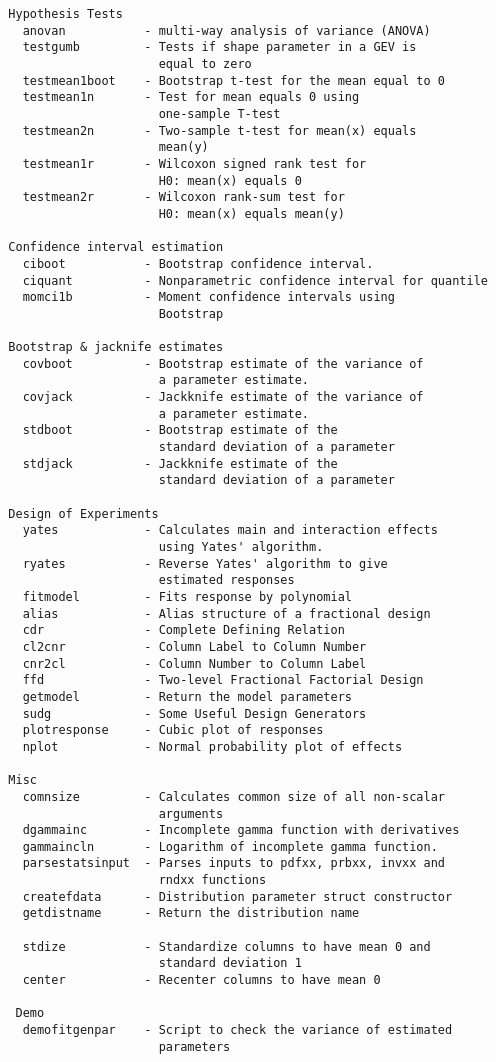 {\begin{verbatim}
  Hypothesis Tests
    anovan           - multi-way analysis of variance (ANOVA)
    testgumb         - Tests if shape parameter in a GEV is
                       equal to zero
    testmean1boot    - Bootstrap t-test for the mean equal to 0
    testmean1n       - Test for mean equals 0 using
                       one-sample T-test
    testmean2n       - Two-sample t-test for mean(x) equals
                       mean(y)
    testmean1r       - Wilcoxon signed rank test for
                       H0: mean(x) equals 0
    testmean2r       - Wilcoxon rank-sum test for
                       H0: mean(x) equals mean(y)

  Confidence interval estimation
    ciboot           - Bootstrap confidence interval.
    ciquant          - Nonparametric confidence interval for quantile
    momci1b          - Moment confidence intervals using
                       Bootstrap

  Bootstrap & jacknife estimates
    covboot          - Bootstrap estimate of the variance of
                       a parameter estimate.
    covjack          - Jackknife estimate of the variance of
                       a parameter estimate.
    stdboot          - Bootstrap estimate of the
                       standard deviation of a parameter
    stdjack          - Jackknife estimate of the
                       standard deviation of a parameter

  Design of Experiments
    yates            - Calculates main and interaction effects
                       using Yates' algorithm.
    ryates           - Reverse Yates' algorithm to give
                       estimated responses
    fitmodel         - Fits response by polynomial
    alias            - Alias structure of a fractional design
    cdr              - Complete Defining Relation
    cl2cnr           - Column Label to Column Number
    cnr2cl           - Column Number to Column Label
    ffd              - Two-level Fractional Factorial Design
    getmodel         - Return the model parameters
    sudg             - Some Useful Design Generators
    plotresponse     - Cubic plot of responses
    nplot            - Normal probability plot of effects

  Misc
    comnsize         - Calculates common size of all non-scalar
                       arguments
    dgammainc        - Incomplete gamma function with derivatives
    gammaincln       - Logarithm of incomplete gamma function.
    parsestatsinput  - Parses inputs to pdfxx, prbxx, invxx and
                       rndxx functions
    createfdata      - Distribution parameter struct constructor
    getdistname      - Return the distribution name

    stdize           - Standardize columns to have mean 0 and
                       standard deviation 1
    center           - Recenter columns to have mean 0

   Demo
    demofitgenpar    - Script to check the variance of estimated
                       parameters
\end{verbatim}
    }


%

